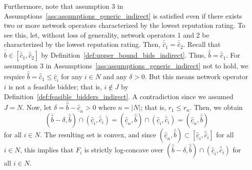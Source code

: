 Furthermore, note that assumption 3 in Assumptions~\ref{ass:assumptions_generic_indirect} is satisfied even if there exists two or more network operators characterized by the lowest reputation rating. To see this, let, without loss of generality, network operators 1 and 2 be characterized by the lowest reputation rating. Then, $\bar{\hat{c}}_1 = \bar{\hat{c}}_2$. Recall that $\bar{\hat{b}}\in [\bar{\hat{c}}_1, \bar{\hat{c}}_2]$ by Definition~\ref{def:upper_bound_bids_indirect}. Thus, $\bar{\hat{b}} = \bar{\hat{c}}_1$. For assumption 3 in Assumptions~\ref{ass:assumptions_generic_indirect} not to hold, we require $\bar{\hat{b}} = \bar{\hat{c}}_1 \leq \underline{\hat{c}}_i$ for any $i\in N$ and any $\delta>0$. But this means network operator $i$ is not a feasible bidder; that is, $i\not\in J$ by Definition~\ref{def:feasible_bidders_indirect}. A contradiction since we assumed $J = N$. Now, let $\delta = \bar{\hat{b}} - \underline{\hat{c}}_n > 0$ where $n = |N|$; that is, $r_1\leq r_n$. Then, we obtain
\begin{equation*}
(\bar{\hat{b}}-\delta, \bar{\hat{b}})\cap (\underline{\hat{c}}_i, \bar{\hat{c}}_i) = (\underline{\hat{c}}_n, \bar{\hat{b}})\cap (\underline{\hat{c}}_i, \bar{\hat{c}}_i) = (\underline{\hat{c}}_n, \bar{\hat{b}})
\end{equation*}
for all $i\in N$. The resulting set is convex, and since $(\underline{\hat{c}}_n, \bar{\hat{b}})\subset [\underline{\hat{c}}_i, \bar{\hat{c}}_i]$ for all $i\in N$, this implies that $F_i$ is strictly log-concave over $(\bar{\hat{b}}-\delta, \bar{\hat{b}})\cap (\underline{\hat{c}}_i, \bar{\hat{c}}_i)$ for all $i\in N$.

